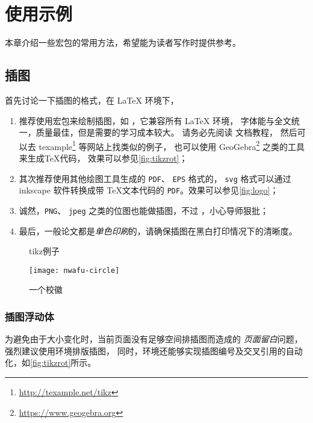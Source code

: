 
\chapter{使用示例}

本章介绍一些宏包的常用方法，希望能为读者写作时提供参考。

\section{插图}

首先讨论一下插图的格式，在 \LaTeX{} 环境下，
\begin{enumerate}
\item 推荐使用宏包来绘制插图，如 ，它兼容所有 \LaTeX{} 环境，
字体能与全文统一，质量最佳，但是需要的学习成本较大。
请务必先阅读  文档教程，
然后可以去 texample\footnote{\url{http://texample.net/tikz}} 等网站上找类似的例子，
也可以使用 GeoGebra\footnote{\url{https://www.geogebra.org}} 之类的工具来生成\TeX 代码，
效果可以参见\autoref{fig:tikzrot}；
\item 其次推荐使用其他绘图工具生成的 \verb|PDF|、 \verb|EPS| 格式的，
\verb|svg| 格式可以通过 inkscape 软件转换成带 \TeX{}文本代码的 \verb|PDF|。效果可以参见\autoref{fig:logo}；
\item 诚然，\verb|PNG|、 \verb|jpeg| 之类的位图也能做插图，不过
  ，小心导师狠批；
\item 最后，一般论文都是\emph{单色印刷}的，请确保插图在黑白打印情况下的清晰度。
\end{enumerate}

\begin{figure}[htb]
  \setcounter{density}{20}
  
  \caption{tikz例子}
  \label{fig:tikzrot}
\end{figure}

\begin{figure}[htb]
  \texttt{[image: nwafu-circle]}
  \caption{一个校徽}
  \label{fig:logo}
\end{figure}

\subsection{插图浮动体}

为避免由于大小变化时，当前页面没有足够空间排插图而造成的
\emph{页面留白}问题，强烈建议使用环境排版插图，
同时，环境还能够实现插图编号及交叉引用的自动化，如\autoref{fig:tikzrot}所示。


